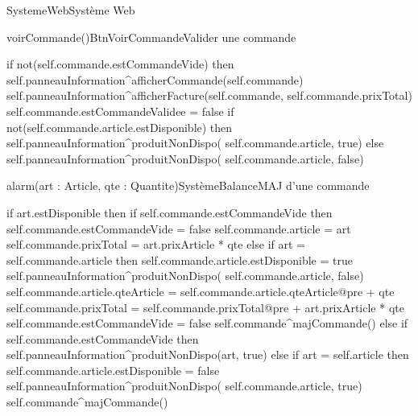 \begin{OM}{SystemeWeb}{Système Web}
    \begin{OMOperation}{voirCommande()}{BtnVoirCommande}{Valider une commande}
        \begin{OMMessages}
        \end{OMMessages}
        \OMNoPre
        \begin{OMPost}
            if not(self.commande.estCommandeVide) then
            self.panneauInformation^afficherCommande(self.commande)
            self.panneauInformation^afficherFacture(self.commande, self.commande.prixTotal)
            self.commande.estCommandeValidee = false
            if not(self.commande.article.estDisponible) then
            self.panneauInformation^produitNonDispo( self.commande.article, true)
            else
            self.panneauInformation^produitNonDispo( self.commande.article, false)
        \end{OMPost}
    \end{OMOperation}

    \begin{OMOperation}{alarm(art : Article, qte : Quantite)}{SystèmeBalance}{MAJ d'une commande}
        \begin{OMMessages}
        \end{OMMessages}
        \OMNoPre
        \begin{OMPost}
            if art.estDisponible then
            if self.commande.estCommandeVide then
            self.commande.estCommandeVide = false
            self.commande.article = art
            self.commande.prixTotal = art.prixArticle * qte
            else
            if art = self.commande.article then
            self.commande.article.estDisponible = true
            self.panneauInformation^produitNonDispo(
            self.commande.article, false)
            self.commande.article.qteArticle =
            self.commande.article.qteArticle@pre + qte
            self.commande.prixTotal = self.commande.prixTotal@pre +
            art.prixArticle * qte
            self.commande.estCommandeVide = false
            self.commande^majCommande()
            else
            if self.commande.estCommandeVide then
            self.panneauInformation^produitNonDispo(art, true)
            else
            if art = self.article then
            self.commande.article.estDisponible = false
            self.panneauInformation^produitNonDispo(
            self.commande.article, true)
            self.commande^majCommande()
        \end{OMPost}
    \end{OMOperation}


\end{OM}
